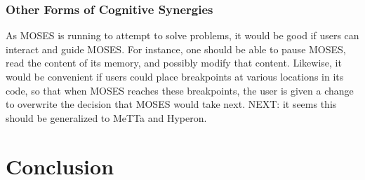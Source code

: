 \documentclass[]{report}
\begin{document}
\subsection{Other Forms of Cognitive Synergies}

As MOSES is running to attempt to solve problems, it would be good if
users can interact and guide MOSES.  For instance, one should be able
to pause MOSES, read the content of its memory, and possibly modify
that content.  Likewise, it would be convenient if users could place
breakpoints at various locations in its code, so that when MOSES
reaches these breakpoints, the user is given a change to overwrite the
decision that MOSES would take next.  NEXT: it seems this should be
generalized to MeTTa and Hyperon.

\chapter{Conclusion}

 
\end{document}
